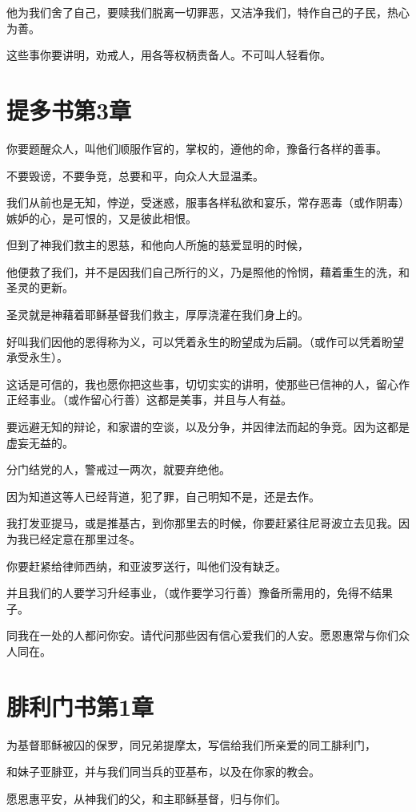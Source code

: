 \documentclass[12pt,oneside]{book}
\begin{document}
他为我们舍了自己，要赎我们脱离一切罪恶，又洁净我们，特作自己的子民，热心为善。

这些事你要讲明，劝戒人，用各等权柄责备人。不可叫人轻看你。

\chapter{提多书第3章}
你要题醒众人，叫他们顺服作官的，掌权的，遵他的命，豫备行各样的善事。

不要毁谤，不要争竞，总要和平，向众人大显温柔。

我们从前也是无知，悖逆，受迷惑，服事各样私欲和宴乐，常存恶毒（或作阴毒）嫉妒的心，是可恨的，又是彼此相恨。

但到了神我们救主的恩慈，和他向人所施的慈爱显明的时候，

他便救了我们，并不是因我们自己所行的义，乃是照他的怜悯，藉着重生的洗，和圣灵的更新。

圣灵就是神藉着耶稣基督我们救主，厚厚浇灌在我们身上的。

好叫我们因他的恩得称为义，可以凭着永生的盼望成为后嗣。（或作可以凭着盼望承受永生）。

这话是可信的，我也愿你把这些事，切切实实的讲明，使那些已信神的人，留心作正经事业。（或作留心行善）这都是美事，并且与人有益。

要远避无知的辩论，和家谱的空谈，以及分争，并因律法而起的争竞。因为这都是虚妄无益的。

分门结党的人，警戒过一两次，就要弃绝他。

因为知道这等人已经背道，犯了罪，自己明知不是，还是去作。

我打发亚提马，或是推基古，到你那里去的时候，你要赶紧往尼哥波立去见我。因为我已经定意在那里过冬。

你要赶紧给律师西纳，和亚波罗送行，叫他们没有缺乏。

并且我们的人要学习升经事业，（或作要学习行善）豫备所需用的，免得不结果子。

同我在一处的人都问你安。请代问那些因有信心爱我们的人安。愿恩惠常与你们众人同在。

\chapter{腓利门书第1章}
为基督耶稣被囚的保罗，同兄弟提摩太，写信给我们所亲爱的同工腓利门，

和妹子亚腓亚，并与我们同当兵的亚基布，以及在你家的教会。

愿恩惠平安，从神我们的父，和主耶稣基督，归与你们。
\end{document}
